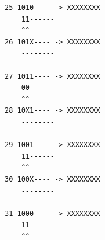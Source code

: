 \documentclass[fleqn]{article}
\begin{document}
\begin{lstlisting}
25 1010---- -> XXXXXXXX                                         
    11------
    ^^      
26 101X---- -> XXXXXXXX                                         
    --------
            
27 1011---- -> XXXXXXXX                                         
    00------
    ^^      
28 10X1---- -> XXXXXXXX                                         
    --------
            
29 1001---- -> XXXXXXXX                                         
    11------
    ^^      
30 100X---- -> XXXXXXXX                                         
    --------
            
31 1000---- -> XXXXXXXX                                         
    11------
    ^^      

\end{lstlisting}
\end{document}
